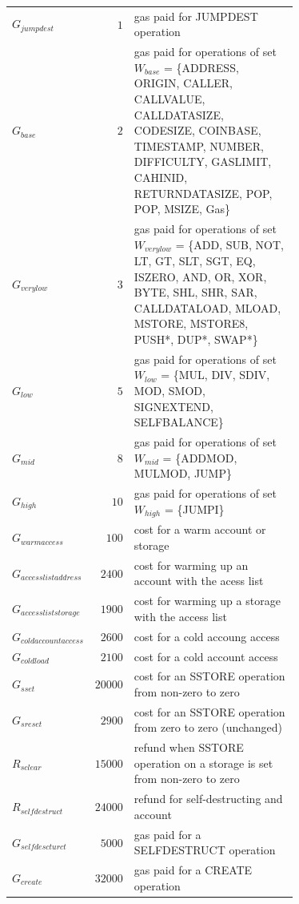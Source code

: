 \documentclass{article}
\begin{document}
\begin{itemize}
\begin{itemize}
\begin{table}[ht!]
\begin{center}
\begin{tabular}{l r p{0.71\linewidth}}
                    $G_{jumpdest}$ & $1$ & gas paid for JUMPDEST operation \\
                    $G_{base}$ & $2$ & gas paid for operations of set $W_{base}$ = \{ADDRESS, ORIGIN, CALLER, CALLVALUE, CALLDATASIZE, CODESIZE, COINBASE, TIMESTAMP, NUMBER, DIFFICULTY, GASLIMIT, CAHINID, RETURNDATASIZE, POP, POP, MSIZE, Gas\} \\
                    $G_{verylow}$ & $3$ & gas paid for operations of set $W_{verylow}$ = \{ADD, SUB, NOT, LT, GT, SLT, SGT, EQ, ISZERO, AND, OR, XOR, BYTE, SHL, SHR, SAR, CALLDATALOAD, MLOAD, MSTORE, MSTORE8, PUSH*, DUP*, SWAP*\} \\
                    $G_{low}$ & $5$ & gas paid for operations of set $W_{low}$ = \{MUL, DIV, SDIV, MOD, SMOD, SIGNEXTEND, SELFBALANCE\} \\ 
                    $G_{mid}$ & $8$ & gas paid for operations of set $W_{mid}$ = \{ADDMOD, MULMOD, JUMP\} \\
                    $G_{high}$ & $10$ & gas paid for operations of set $W_{high}$ = \{JUMPI\} \\
                    $G_{warmaccess}$ & $100$ & cost for a warm account or storage \\
                    $G_{accesslistaddress}$ & $2400$ & cost for warming up an account with the acess list \\
                    $G_{accessliststorage}$ & $1900$ & cost for warming up a storage with the access list \\
                    $G_{coldaccountaccess}$ & $2600$ & cost for a cold accoung access \\
                    $G_{coldload}$ & $2100$ & cost for a cold account access \\
                    $G_{sset}$ & $20000$ & cost for an SSTORE operation from non-zero to zero \\
                    $G_{sreset}$ & $2900$ & cost for an SSTORE operation from zero to zero (unchanged) \\
                    $R_{sclear}$ & $15000$ & refund when SSTORE operation on a storage is set from non-zero to zero \\
                    $R_{selfdestruct}$ & $24000$ & refund for self-destructing and account \\
                    $G_{selfdescturct}$ & $5000$ & gas paid for a SELFDESTRUCT operation \\
                    $G_{create}$ & $32000$ & gas paid for a CREATE operation \\

\end{tabular}
\end{center}
\end{table}
\end{itemize}
\end{itemize}
\end{document}
